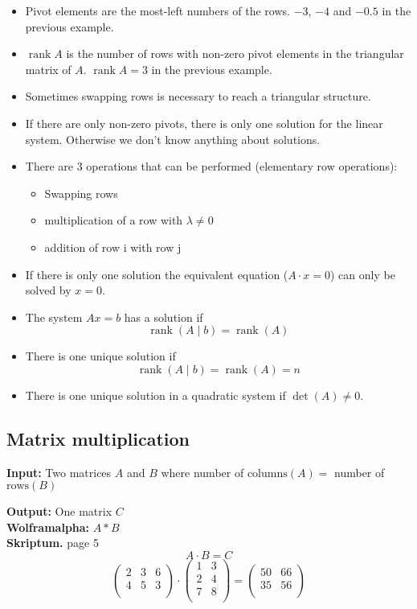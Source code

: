 \documentclass[a4paper,twocolumn]{article}
\DeclareMathOperator{\rank}{rank}
\newcommand{\io}[2]{{\par\noindent\textbf{Input:} #1 \\}{\textbf{Output:} #2 \\}}
\newcommand{\wa}[1]{\textbf{Wolframalpha:} $#1$ \\}
\newcommand{\scriptref}[1]{\textbf{Skriptum.} page #1 \\}
\begin{document}
\begin{itemize}
  \item Pivot elements are the most-left numbers of the rows.
        $-3$, $-4$ and $-0.5$ in the  previous example.
  \item $\rank{A}$ is the number of rows with non-zero pivot elements
        in the triangular matrix of $A$. $\rank{A} = 3$ in the
        previous example.
  \item Sometimes swapping rows is necessary to reach a triangular
        structure.
  \item If there are only non-zero pivots, there is only one solution
        for the linear system. Otherwise we don't know anything about
        solutions.
  \item There are 3 operations that can be performed (elementary row
        operations):
    \begin{itemize}
      \item Swapping rows
      \item multiplication of a row with $\lambda \neq 0$
      \item addition of row i with row j
    \end{itemize}
  \item If there is only one solution the equivalent equation
        ($A\cdot x = 0$) can only be solved by $x = 0$.
  \item The system $Ax = b$ has a solution if 
        \[
            \rank{\left(A\mid b\right)} = \rank{(A)}
        \]
  \item There is one unique solution if
        \[
            \rank{\left(A\mid b\right)} = \rank{(A)} = n
        \]
  \item There is one unique solution in a quadratic system if
        $\det{(A)} \neq 0$.
\end{itemize}

\subsection{Matrix multiplication}

\io{Two matrices $A$ and $B$ where
    number of $\text{columns}(A) =$ number of $\text{rows}(B)$
}{One matrix $C$}
\wa{A * B}
\scriptref{5}
%
\[
    A \cdot B = C
\] \[
    \begin{pmatrix}
        2 & 3 & 6 \\
        4 & 5 & 3 \\
    \end{pmatrix}
    \cdot
    \begin{pmatrix}
        1 & 3 \\
        2 & 4 \\
        7 & 8 \\
    \end{pmatrix}
    =
    \begin{pmatrix}
        50 & 66 \\
        35 & 56 \\
    \end{pmatrix}
\]
\end{document}
